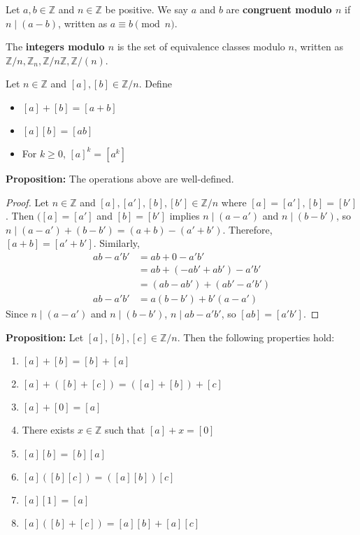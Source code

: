 \documentclass [12pt] {article}
\newcommand{\Z}{\mathbb{Z}}
\newenvironment{definition}[1]{\begin{tcolorbox}[title={Definition: #1},colback=blue!5!white,colframe=black!75!blue]}{\end{tcolorbox}}
\renewcommand{\bf}[1]{\textbf{{#1}}}
\begin{document}
\begin{definition}{Congruent Modulo $n$}
    Let $a, b \in \Z$ and $n \in \Z$ be positive. We say $a$ and $b$ are \bf{congruent modulo $n$}
    if $n \mid (a - b)$, written as $a \equiv b \pmod{n}$.
    \vspace{1em}

    The \bf{integers modulo $n$} is the set of equivalence classes modulo $n$, written as
    $\Z/n, \Z_n, \Z/n\Z, \Z/(n)$.
\end{definition}

\begin{definition}{Operations on $\Z/n$}
    Let $n \in \Z$ and $[a], [b] \in \Z/n$. Define
    \begin{itemize}[label=$\to$]
        \item $[a] + [b] = [a + b]$
        \item $[a][b] = [ab]$
        \item For $k \geq 0$, $[a]^k = [a^k]$
    \end{itemize}
\end{definition}
\bf{Proposition:} The operations above are well-defined.
\begin{proof}
    Let $n \in \Z$ and $[a], [a'], [b], [b'] \in \Z/n$ where $[a] = [a'], [b] = [b']$. Then
    $([a] = [a']$ and $[b] = [b']$ implies $n \mid (a - a')$ and $n \mid (b - b')$, so
    $n \mid (a - a') + (b - b') = (a + b) - (a' + b')$. Therefore, $[a + b] = [a' + b']$. Similarly,
    \begin{align*}
        ab - a'b' &= ab + 0 - a'b' \\
                  &= ab + (-ab' + ab') - a'b' \\
                  &= (ab - ab') + (ab' - a'b') \\
        ab - a'b' &= a(b - b') + b'(a - a')
    \end{align*}
    Since $n \mid (a - a')$ and $n \mid (b - b')$, $n \mid ab - a'b'$, so $[ab] = [a'b']$.
\end{proof}
\bf{Proposition:} Let $[a], [b], [c] \in \Z/n$. Then the following properties hold:
\begin{enumerate}[label=(\arabic*)]
    \item $[a] + [b] = [b] + [a]$
    \item $[a] + ([b] + [c]) = ([a] + [b]) + [c]$
    \item $[a] + [0] = [a]$
    \item There exists $x \in \Z$ such that $[a] + x = [0]$
    \item $[a][b] = [b][a]$
    \item $[a] ([b][c]) = ([a][b]) [c]$
    \item $[a][1] = [a]$
    \item $[a] ([b] + [c]) = [a][b] + [a][c]$
\end{enumerate}
\end{document}
